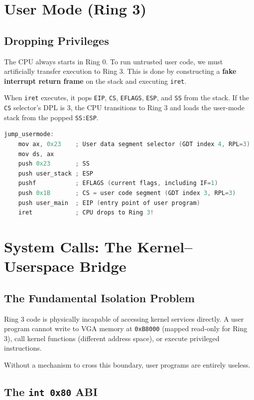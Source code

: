 \documentclass[12pt,a4paper]{report}
\begin{document}
\section{User Mode (Ring 3)}

\subsection{Dropping Privileges}

The CPU always starts in Ring 0. To run untrusted user code, we must artificially
transfer execution to Ring 3. This is done by constructing a \textbf{fake interrupt
return frame} on the stack and executing \texttt{iret}.

When \texttt{iret} executes, it pops \texttt{EIP}, \texttt{CS}, \texttt{EFLAGS}, \texttt{ESP},
and \texttt{SS} from the stack. If the \texttt{CS} selector's DPL is 3, the CPU
transitions to Ring 3 and loads the user-mode stack from the popped \texttt{SS:ESP}.

\begin{lstlisting}[language=C++, title=boot/usermode.asm -- Fake IRET frame for Ring 3]
jump_usermode:
    mov ax, 0x23    ; User data segment selector (GDT index 4, RPL=3)
    mov ds, ax
    push 0x23       ; SS
    push user_stack ; ESP
    pushf           ; EFLAGS (current flags, including IF=1)
    push 0x1B       ; CS = user code segment (GDT index 3, RPL=3)
    push user_main  ; EIP (entry point of user program)
    iret            ; CPU drops to Ring 3!
\end{lstlisting}

\section{System Calls: The Kernel--Userspace Bridge}

\subsection{The Fundamental Isolation Problem}

Ring 3 code is physically incapable of accessing kernel services directly. A user
program cannot write to VGA memory at \texttt{0xB8000} (mapped read-only for Ring 3),
call kernel functions (different address space), or execute privileged instructions.

Without a mechanism to cross this boundary, user programs are entirely useless.

\subsection{The \texttt{int 0x80} ABI}
\end{document}
